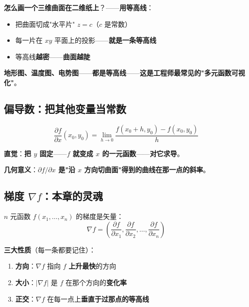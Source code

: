 \textbf{怎么画一个三维曲面在二维纸上}？——\textbf{用等高线}：

\begin{itemize}
\item 把曲面切成"水平片" $z = c$（$c$ 是常数）
\item 每一片在 $xy$ 平面上的投影——\textbf{就是一条等高线}
\item 等高线\textbf{越密}——\textbf{曲面越陡}
\end{itemize}

\textbf{地形图、温度图、电势图}——\textbf{都是等高线}——\textbf{这是工程师最常见的"多元函数可视化"}。

\subsection{偏导数：把其他变量当常数}

\begin{definition}[偏导数]
\[
\frac{\partial f}{\partial x}(x_0, y_0) = \lim_{h \to 0} \frac{f(x_0+h, y_0) - f(x_0, y_0)}{h}
\]
\end{definition}

\textbf{直觉}：\textbf{把 $y$ 固定}——\textbf{$f$ 就变成 $x$ 的一元函数}——\textbf{对它求导}。

\textbf{几何意义}：\textbf{$\partial f / \partial x$ 是"沿 $x$ 方向切曲面"得到的曲线在那一点的斜率}。

\subsection{梯度 \texorpdfstring{$\nabla f$}{∇f}：本章的灵魂}

\begin{definition}[梯度]
$n$ 元函数 $f(x_1, \ldots, x_n)$ 的梯度是矢量：
\[
\nabla f = \left( \frac{\partial f}{\partial x_1}, \frac{\partial f}{\partial x_2}, \ldots, \frac{\partial f}{\partial x_n} \right)
\]
\end{definition}

\textbf{三大性质}（每一条都要记住）：

\begin{enumerate}
\item \textbf{方向}：$\nabla f$ 指向 $f$ \textbf{上升最快}的方向
\item \textbf{大小}：$|\nabla f|$ 是 $f$ 在那个方向的\textbf{变化率}
\item \textbf{正交}：$\nabla f$ 在每一点上\textbf{垂直于过那点的等高线}
\end{enumerate}

